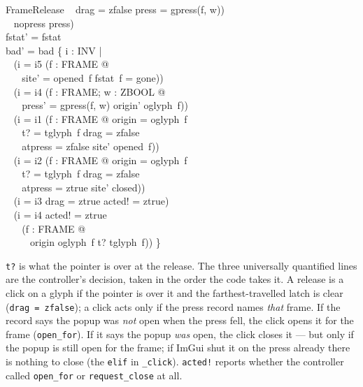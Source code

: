 \documentclass[a4paper,10pt,fleqn]{article}
\begin{document}
\begin{schema}{FrameRelease}
  \quad~ \land drag = zfalse \land press = gpress(f, w)) \\
  \quad~ \THEN nopress \ELSE press) \\
  fstat' = fstat \\
  bad' = bad \cup \{ i : INV | \\
  \quad~ (i = i5 \land (\exists f : FRAME @ \\
  \quad~ \quad~ site' = opened~f \land fstat~f = gone)) \\
  \quad~ \lor (i = i4 \land (\exists f : FRAME; w : ZBOOL @ \\
  \quad~ \quad~ press' = gpress(f, w) \land origin' \neq oglyph~f)) \\
  \quad~ \lor (i = i1 \land (\exists f : FRAME @ origin = oglyph~f \\
  \quad~ \quad~ \land t? = tglyph~f \land drag = zfalse \\
  \quad~ \quad~ \land atpress = zfalse \land site' \neq opened~f)) \\
  \quad~ \lor (i = i2 \land (\exists f : FRAME @ origin = oglyph~f \\
  \quad~ \quad~ \land t? = tglyph~f \land drag = zfalse \\
  \quad~ \quad~ \land atpress = ztrue \land site' \neq closed)) \\
  \quad~ \lor (i = i3 \land drag = ztrue \land acted! = ztrue) \\
  \quad~ \lor (i = i4 \land acted! = ztrue \\
  \quad~ \quad~ \land (\forall f : FRAME @ \\
  \quad~ \quad~ \quad~ origin \neq oglyph~f \lor t? \neq tglyph~f)) \}
\end{schema}

\texttt{t?} is what the pointer is over at the release.  The three universally
quantified lines are the controller's decision, taken in the order the code
takes it.  A release is a click on a glyph if the pointer is over it and the
farthest-travelled latch is clear (\texttt{drag~=~zfalse}); a click acts only
if the press record names \emph{that} frame.  If the record says the popup was
\emph{not} open when the press fell, the click opens it for the frame
(\texttt{open\_for}).  If it says the popup \emph{was} open, the click closes
it --- but only if the popup is still open for the frame; if ImGui shut it on
the press already there is nothing to close (the \texttt{elif} in
\texttt{\_click}).  \texttt{acted!} reports whether the controller called
\texttt{open\_for} or \texttt{request\_close} at all.
\end{document}
